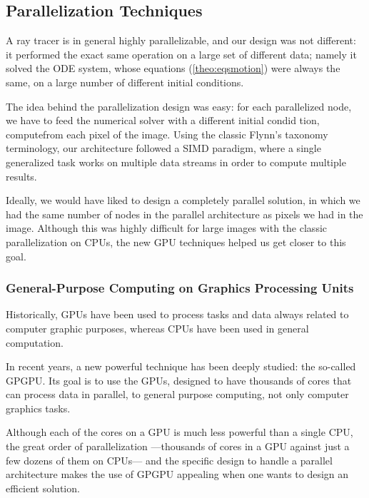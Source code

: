 \subsection{Parallelization Techniques}
\label{sec:parallel}

A ray tracer is in general highly parallelizable, and our design was not different: it performed the exact same operation on a large set of different data; namely it solved the \ac{ODE} system, whose equations (\autoref{theo:eqsmotion}) were always the same, on a large number of different initial conditions.

The idea behind the parallelization design was easy: for each parallelized node, we have to feed the numerical solver with a different initial condid tion, computefrom each pixel of the image. Using the classic Flynn's taxonomy \cite{flynn72} terminology, our architecture followed a \ac{SIMD} paradigm, where a single generalized task works on multiple data streams in order to compute multiple results.

Ideally, we would have liked to design a completely parallel solution, in which we had the same number of nodes in the parallel architecture as pixels we had in the image. Although this was highly difficult for large images with the classic parallelization on \acp{CPU}, the new \ac{GPU} techniques helped us get closer to this goal.

\subsubsection*{General-Purpose Computing on Graphics Processing Units}

Historically, \acp{GPU} have been used to process tasks and data always related to computer graphic purposes, whereas \acp{CPU} have been used in general computation.

In recent years, a new powerful technique has been deeply studied: the so-called \ac{GPGPU}. Its goal is to use the \acp{GPU}, designed to have thousands of cores that can process data in parallel, to general purpose computing, not only computer graphics tasks.

Although each of the cores on a \ac{GPU} is much less powerful than a single \ac{CPU}, the great order of parallelization ---thousands of cores in a \ac{GPU} against just a few dozens of them on \acp{CPU}--- and the specific design to handle a parallel architecture makes the use of \ac{GPGPU} appealing when one wants to design an efficient solution.

